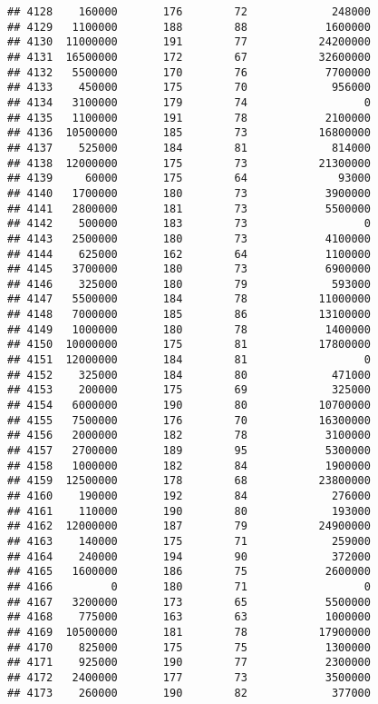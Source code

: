 \documentclass[
]{article}
\begin{document}
\begin{verbatim}
## 4128    160000       176        72             248000
## 4129   1100000       188        88            1600000
## 4130  11000000       191        77           24200000
## 4131  16500000       172        67           32600000
## 4132   5500000       170        76            7700000
## 4133    450000       175        70             956000
## 4134   3100000       179        74                  0
## 4135   1100000       191        78            2100000
## 4136  10500000       185        73           16800000
## 4137    525000       184        81             814000
## 4138  12000000       175        73           21300000
## 4139     60000       175        64              93000
## 4140   1700000       180        73            3900000
## 4141   2800000       181        73            5500000
## 4142    500000       183        73                  0
## 4143   2500000       180        73            4100000
## 4144    625000       162        64            1100000
## 4145   3700000       180        73            6900000
## 4146    325000       180        79             593000
## 4147   5500000       184        78           11000000
## 4148   7000000       185        86           13100000
## 4149   1000000       180        78            1400000
## 4150  10000000       175        81           17800000
## 4151  12000000       184        81                  0
## 4152    325000       184        80             471000
## 4153    200000       175        69             325000
## 4154   6000000       190        80           10700000
## 4155   7500000       176        70           16300000
## 4156   2000000       182        78            3100000
## 4157   2700000       189        95            5300000
## 4158   1000000       182        84            1900000
## 4159  12500000       178        68           23800000
## 4160    190000       192        84             276000
## 4161    110000       190        80             193000
## 4162  12000000       187        79           24900000
## 4163    140000       175        71             259000
## 4164    240000       194        90             372000
## 4165   1600000       186        75            2600000
## 4166         0       180        71                  0
## 4167   3200000       173        65            5500000
## 4168    775000       163        63            1000000
## 4169  10500000       181        78           17900000
## 4170    825000       175        75            1300000
## 4171    925000       190        77            2300000
## 4172   2400000       177        73            3500000
## 4173    260000       190        82             377000

\end{verbatim}
\end{document}
